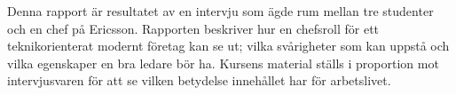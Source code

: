 
Denna rapport är resultatet av en intervju som ägde rum mellan tre studenter och en chef på Ericsson. Rapporten beskriver hur en chefsroll för ett teknikorienterat modernt företag kan se ut; vilka svårigheter som kan uppstå och vilka egenskaper en bra ledare bör ha. Kursens material ställs i proportion mot intervjusvaren för att se vilken betydelse innehållet har för arbetslivet.